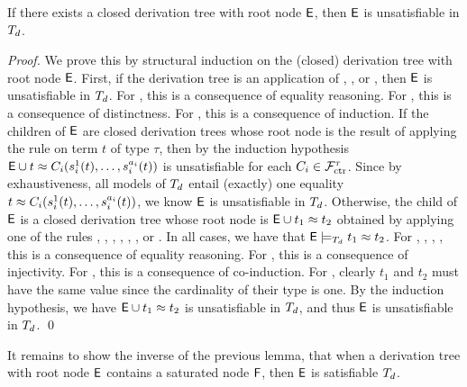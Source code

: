\begin{lemma} \label{lem:rs}
If there exists a closed derivation tree with root node $\mathsf{E}$, then $\mathsf{E}$ is unsatisfiable in $T_{d}$.
\end{lemma}
\begin{proof}
We prove this by structural induction on the (closed) derivation tree with root node $\mathsf{E}$.
First, if the derivation tree is an application of , , or ,
then $\mathsf{E}$ is unsatisfiable in $T_{d}$.
For , this is a consequence of equality reasoning.
For , this is a consequence of distinctness.
For , this is a consequence of induction. 
If the children of $\mathsf{E}$ are closed derivation trees 
whose root node is the result of applying the rule  on term $t$ of type $\tau$,
then by the induction hypothesis $\mathsf{E} \cup t \approx C_i( s^1_i( t ), \ldots, s^{a_i}_i( t ) )$ is unsatisfiable
for each $C_i \in \mathcal{F}_{\mathrm{ctr}}^\tau$.
Since by exhaustiveness, all models of $T_{d}$ entail (exactly) one equality $t \approx C_i( s^1_i( t ), \ldots, s^{a_i}_i( t ) )$,
we know $\mathsf{E}$ is unsatisfiable in $T_{d}$.
Otherwise, the child of $\mathsf{E}$ is a closed derivation tree 
whose root node is $\mathsf{E} \cup t_1 \approx t_2$ obtained by applying one of the rules , , , , , , or .
In all cases, we have that $\mathsf{E} \models_{T_{d}} t_1 \approx t_2$.
For , , , , this is a consequence of equality reasoning.
For , this is a consequence of injectivity.
For , this is a consequence of co-induction. 
For , clearly $t_1$ and $t_2$ must have the same value since the cardinality of their type is one.
By the induction hypothesis, we have $\mathsf{E} \cup t_1 \approx t_2$ is unsatisfiable in $T_{d}$, 
and thus $\mathsf{E}$ is unsatisfiable in $T_{d}$.
\qed
\end{proof}

It remains to show the inverse of the previous lemma, that when a derivation tree with root node $\mathsf{E}$ contains a saturated node $\mathsf{F}$,
then $\mathsf{E}$ is satisfiable $T_{d}$.


